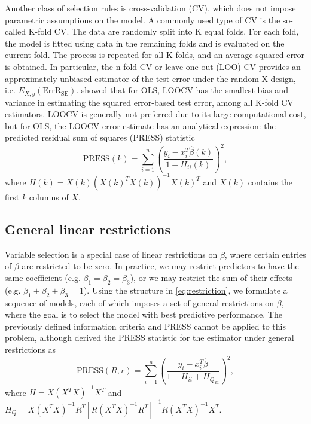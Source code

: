 Another class of selection rules is cross-validation (CV), which does not impose parametric assumptions on the model. A commonly used type of CV is the so-called K-fold CV. The data are randomly split into K equal folds. For each fold, the model is fitted using data in the remaining folds and is evaluated on the current fold. The process is repeated for all K folds, and an average squared error is obtained. In particular, the n-fold CV or leave-one-out (LOO) CV provides an approximately unbiased estimator of the test error under the random-X design, i.e. $E_{X,y}(\text{ErrR}_\text{SE})$. \citet{burman1989comparative} showed that for OLS, LOOCV has the smallest bias and variance in estimating the squared error-based test error, among all K-fold CV estimators. LOOCV is generally not preferred due to its large computational cost, but for OLS, the LOOCV error estimate has an analytical expression: the predicted residual sum of squares (PRESS) statistic \citep{allen1974relationship}
\begin{equation*}
\text{PRESS}(k) = \sum_{i=1}^n \left( \frac{y_i-x_i^T\hat\beta(k)}{1-H_{ii}(k)} \right)^2,
\end{equation*}
where $H(k) = X(k)(X(k)^T X(k))^{-1}X(k)^T$ and $X(k)$ contains the first $k$ columns of $X$. 

\subsection{General linear restrictions}
Variable selection is a special case of linear restrictions on $\beta$, where certain entries of $\beta$ are restricted to be zero. In practice, we may restrict predictors to have the same coefficient (e.g. $\beta_1=\beta_2=\beta_3$), or we may restrict the sum of their effects (e.g. $\beta_1+\beta_2+\beta_3=1$). Using the structure in \eqref{eq:restriction}, we formulate a sequence of models, each of which imposes a set of general restrictions on $\beta$, where the goal is to select the model with best predictive performance. The previously defined information criteria and PRESS cannot be applied to this problem, although \citet{tarpey2000note} derived the PRESS statistic for the estimator under general restrictions as
\begin{equation*}
\text{PRESS}(R,r) = \sum_{i=1}^n \left( \frac{y_i-x_i^T\hat\beta}{1-H_{ii}+{H_Q}_{ii}} \right)^2,
\end{equation*}
where $H=X(X^T X)^{-1} X^T$ and $H_Q = X (X^T X)^{-1} R^T \left[ R (X^T X)^{-1} R^T \right]^{-1} R (X^T X)^{-1} X^T$.  


